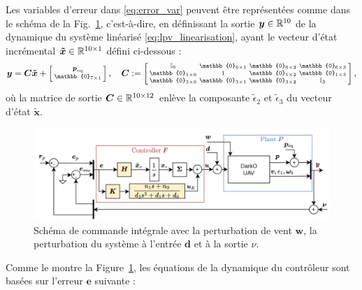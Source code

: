 Les variables d'erreur dans \eqref{eq:error_var} peuvent être représentées comme dans le schéma  de la Fig.~\ref{fig:commande_int6DOF}, c'est-à-dire, en définissant la sortie $\boldsymbol{y}\in {\mathbb R}^{10}$ de la dynamique du système linéarisé \eqref{eq:lpv_linearisation}, ayant le vecteur d'état incrémental $\boldsymbol{\tilde{x}} \in {\mathbb R}^{10 \times 1}$ défini ci-dessous : 
\begin{align}
    \label{eq:output_lin}
    \boldsymbol{y} = \boldsymbol{C} \boldsymbol{\tilde{x}} + \smallmat{\boldsymbol{p}_{\mathrm{eq}} \\ \mathbb{0}_{7 \times 1}}, \quad
 \boldsymbol{C} := \smallmat{\mathbb{I}_{6} & \mathbb{0}_{6\times 1} & \mathbb{0}_{6\times 2} &\mathbb{0}_{6\times 3}\\
    \mathbb{0}_{1\times 6} & 1 & \mathbb{0}_{1\times 2} &\mathbb{0}_{1\times 3}\\
    \mathbb{0}_{3\times 6} & \mathbb{0}_{3\times 1} & \mathbb{0}_{3\times 2} &  \mathbb{I}_{3}
},
\end{align}
où la matrice de sortie $\boldsymbol{C} \in {\mathbb R}^{10\times12}$ enlève la composante $\tilde{\epsilon}_{2}$ et $\tilde{\epsilon}_{3}$ du vecteur d'état $\tilde{\boldsymbol{x}}$. 

\begin{figure}[t!]
    \centering
    \includegraphics[width=0.8\columnwidth]{figures/commande_integrale.png}
    \caption{Schéma de commande intégrale avec la perturbation de vent $\boldsymbol{w}$, la perturbation du système à l'entrée $\boldsymbol{d}$ et à la sortie $\nu$.}
    \label{fig:commande_int6DOF}
\end{figure}

Comme le montre la Figure~\ref{fig:commande_int6DOF}, les équations de la dynamique du contrôleur sont basées sur l'erreur $\boldsymbol{e}$ suivante :

